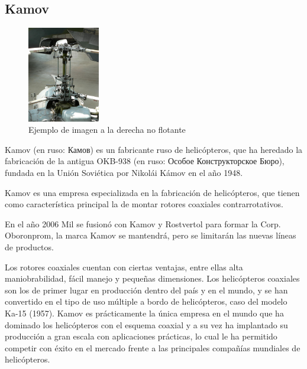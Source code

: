 \subsection{Kamov}
\begin{figure}
  \begin{center}
    \includegraphics[width=0.28\textwidth]{images/kamov.jpg}
  \end{center}
  \caption{Ejemplo de imagen a la derecha no flotante}
\end{figure}
Kamov (en ruso: Камов) es un fabricante ruso de helicópteros, que ha heredado la fabricación de la antigua OKB-938 (en ruso: Особое Конструкторское Бюро), fundada en la Unión Soviética por Nikolái Kámov en el año 1948.


Kamov es una empresa especializada en la fabricación de helicópteros, que tienen como característica principal la de montar rotores coaxiales contrarrotativos.


En el año 2006 Mil se fusionó con Kamov y Rostvertol para formar la Corp. Oboronprom, la marca Kamov se mantendrá, pero se limitarán las nuevas líneas de productos.


Los rotores coaxiales cuentan con ciertas ventajas, entre ellas alta maniobrabilidad, fácil manejo y pequeñas dimensiones. Los helicópteros coaxiales son los de primer lugar en producción dentro del país y en el mundo, y se han convertido en el tipo de uso múltiple a bordo de helicópteros, caso del modelo Ka-15 (1957). Kamov es prácticamente la única empresa en el mundo que ha dominado los helicópteros con el esquema coaxial y a su vez ha implantado su producción a gran escala con aplicaciones prácticas, lo cual le ha permitido competir con éxito en el mercado frente a las principales compañías mundiales de helicópteros. 
